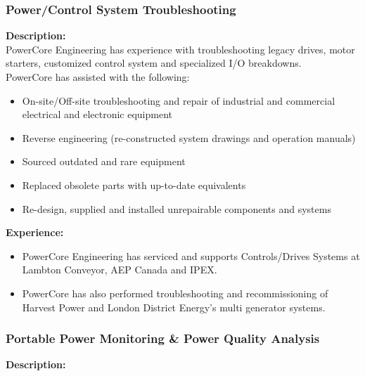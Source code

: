 \pagebreak

	
\subsubsection{Power/Control System Troubleshooting }
\label{ETQ:PCEExp:TS}


\noindent \textbf{Description:}\\
	

PowerCore Engineering has experience with troubleshooting legacy drives, motor starters, customized control system and specialized I/O breakdowns.\\

PowerCore has assisted with the following: 
\begin{itemize}
	\item On-site/Off-site troubleshooting and repair of industrial and commercial electrical and electronic equipment
	\item Reverse engineering (re-constructed system drawings and operation manuals)
	\item Sourced outdated and rare equipment
	\item Replaced obsolete parts with up-to-date equivalents
	\item Re-design, supplied and installed unrepairable components and systems
\end{itemize}

\vspace{10 mm}
\noindent \textbf{Experience:}	

\begin{itemize}
	\item PowerCore Engineering has serviced and supports Controls/Drives Systems at Lambton Conveyor, AEP Canada and IPEX.  	
	\item PowerCore has also performed troubleshooting and recommissioning of Harvest Power and London District Energy's multi generator systems.
\end{itemize}

\pagebreak

\subsubsection{Portable Power Monitoring \& Power Quality Analysis}
\label{ETQ:PCEExp:PowM}


\noindent \textbf{Description:}\\
	

